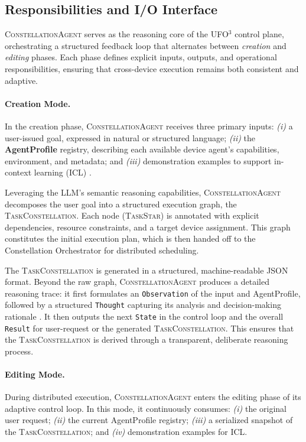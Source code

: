 \documentclass[10pt]{article} %
\newcommand{\ufo}{\textsc{UFO}$^3$\xspace}
\newcommand{\cagent}{\textsc{ConstellationAgent}\xspace}
\newcommand{\TaskConstellation}{\textsc{TaskConstellation}\xspace}
\newcommand{\TaskStar}{\textsc{TaskStar}\xspace}
\begin{document}
\subsection{Responsibilities and I/O Interface}
\label{subsec:responsibilities}

\cagent serves as the reasoning core of the \ufo control plane, orchestrating a structured feedback loop that alternates between \textit{creation} and \textit{editing} phases. Each phase defines explicit inputs, outputs, and operational responsibilities, ensuring that cross-device execution remains both consistent and adaptive.

\paragraph{Creation Mode.}
In the creation phase, \cagent receives three primary inputs:
\emph{(i)} a user-issued goal, expressed in natural or structured language;  
\emph{(ii)} the \textbf{AgentProfile} registry, describing each available device agent's capabilities, environment, and metadata; and  
\emph{(iii)} demonstration examples to support in-context learning (ICL) \cite{dong2022survey, jiang2024xpert}.

Leveraging the LLM's semantic reasoning capabilities, \cagent decomposes the user goal into a structured execution graph, the \TaskConstellation. Each node (\TaskStar) is annotated with explicit dependencies, resource constraints, and a target device assignment. This graph constitutes the initial execution plan, which is then handed off to the Constellation Orchestrator for distributed scheduling.

The \TaskConstellation is generated in a structured, machine-readable JSON format. Beyond the raw graph, \cagent produces a detailed reasoning trace: it first formulates an \texttt{Observation} of the input and AgentProfile, followed by a structured \texttt{Thought} capturing its analysis and decision-making rationale \cite{wei2022chain, ding2024everything}. It then outputs the next \texttt{State} in the control loop and the overall \texttt{Result} for user-request or the generated \TaskConstellation. This ensures that the \TaskConstellation is derived through a transparent, deliberate reasoning process.

\paragraph{Editing Mode.}
During distributed execution, \cagent enters the editing phase of its adaptive control loop. In this mode, it continuously consumes:  
\emph{(i)} the original user request;  
\emph{(ii)} the current AgentProfile registry;  
\emph{(iii)} a serialized snapshot of the \TaskConstellation; and  
\emph{(iv)} demonstration examples for ICL.
\end{document}
